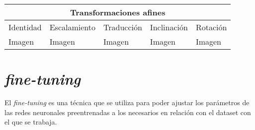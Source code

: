 \begin{tabular}{ |p{2.5cm}|p{2.5cm}|p{2.5cm}|p{2.5cm}|p{2.5cm}|  }
	\hline
	\multicolumn{5}{|c|}{Transformaciones afines}\\ 
	\hline
	Identidad & Escalamiento & Traducción & Inclinación & Rotación\\
	\hline
	Imagen   & Imagen    &Imagen&   Imagen &   Imagen\\
	\hline
   \end{tabular}

\section{\textit{fine-tuning}}
   El \textit{fine-tuning} es una técnica que se utiliza para poder ajustar los parámetros de las redes neuronales preentrenadas a los necesarios en relación con
   el dataset con el que se trabaja.